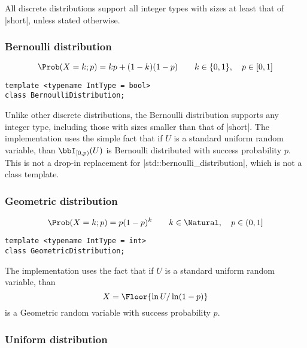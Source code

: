 All discrete distributions support all integer types with sizes at least that
of |short|, unless stated otherwise.

\subsubsection{Bernoulli distribution}

\begin{equation*}
  \Prob(X = k;p) = kp + (1 - k)(1 - p) \qquad
  k \in \{0, 1\},\quad p \in [0, 1]
\end{equation*}
\begin{Verbatim}
template <typename IntType = bool>
class BernoulliDistribution;
\end{Verbatim}
Unlike other discrete distributions, the Bernoulli distribution supports any
integer type, including those with sizes smaller than that of |short|. The
implementation uses the simple fact that if $U$ is a standard uniform random
variable, than $\bbI_{[0,p)}(U)$ is Bernoulli distributed with success
probability $p$. This is not a drop-in replacement for
|std::bernoulli_distribution|, which is not a class template.

\subsubsection{Geometric distribution}

\begin{equation*}
  \Prob(X = k;p) = p(1-p)^k \qquad
  k \in \Natural,\quad p \in (0, 1]
\end{equation*}
\begin{Verbatim}
template <typename IntType = int>
class GeometricDistribution;
\end{Verbatim}
The implementation uses the fact that if $U$ is a standard uniform random
variable, than
\begin{equation*}
  X = \Floor{\ln U / \ln(1-p)}
\end{equation*}
is a Geometric random variable with success probability $p$.

\subsubsection{Uniform distribution}

